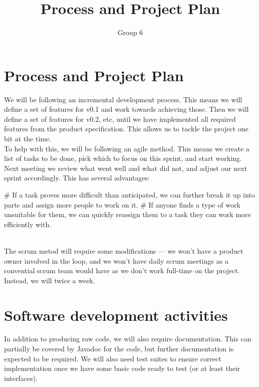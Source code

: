 \documentclass{article}
\title{Process and Project Plan}
\author{Group 6}
\begin{document}
\maketitle

\section*{Process and Project Plan}

We will be following an incremental development process. This means we will define a set of features for v0.1 and work towards achieving those. Then we will define a set of features for v0.2, etc, until we have implemented all required features from the product specification. This allows us to tackle the project one bit at the time.\\

To help with this, we will be following an agile method. This means we create a list of tasks to be done, pick which to focus on this sprint, and start working. Next meeting we review what went well and what did not, and adjust our next sprint accordingly. This has several advantages:\\

\begin{easylist}[enumerate]
    # If a task proves more difficult than anticipated, we can further break it up into parts and assign more people to work on it.
    # If anyone finds a type of work unsuitable for them, we can quickly reassign them to a task they can work more efficiently with.
\end{easylist}\mbox{}\\

The scrum metod will require some modifications --- we won't have a product owner involved in the loop, and we won't have daily scrum meetings as a convential scrum team would have as we don't work full-time on the project. Instead, we will twice a week.

\section*{Software development activities}

In addition to producing raw code, we will also require documentation. This can partially be covered by Javadoc for the code, but further documentation is expected to be required. We will also need test suites to ensure correct implementation once we have some basic code ready to test (or at least their interfaces).
\end{document}
